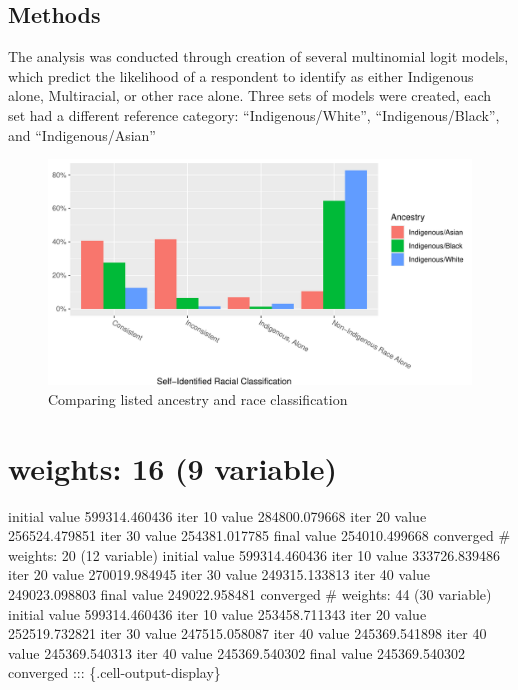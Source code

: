 \documentclass[
  12pt,
  letterpaper,
]{article}
\begin{document}
\hypertarget{methods}{%
\subsection{Methods}\label{methods}}

The analysis was conducted through creation of several multinomial logit
models, which predict the likelihood of a respondent to identify as
either Indigenous alone, Multiracial, or other race alone. Three sets of
models were created, each set had a different reference category:
``Indigenous/White'', ``Indigenous/Black'', and ``Indigenous/Asian''

\begin{figure}[!t]

{\centering \includegraphics{main_manuscript_files/figure-pdf/fig-race-ancestry-1.pdf}

}

\caption{\label{fig-race-ancestry}Comparing listed ancestry and race
classification}

\end{figure}

\hypertarget{weights-16-9-variable}{%
\section{weights: 16 (9 variable)}\label{weights-16-9-variable}}

initial value 599314.460436 iter 10 value 284800.079668 iter 20 value
256524.479851 iter 30 value 254381.017785 final value 254010.499668
converged \# weights: 20 (12 variable) initial value 599314.460436 iter
10 value 333726.839486 iter 20 value 270019.984945 iter 30 value
249315.133813 iter 40 value 249023.098803 final value 249022.958481
converged \# weights: 44 (30 variable) initial value 599314.460436 iter
10 value 253458.711343 iter 20 value 252519.732821 iter 30 value
247515.058087 iter 40 value 245369.541898 iter 40 value 245369.540313
iter 40 value 245369.540302 final value 245369.540302 converged :::
\{.cell-output-display\}
\end{document}

